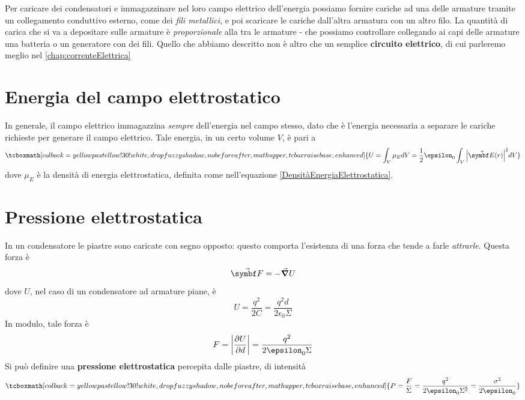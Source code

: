 \begin{observe}
	Per caricare dei condensatori e immagazzinare nel loro campo elettrico dell'energia possiamo fornire cariche ad una delle armature tramite un collegamento conduttivo esterno, come dei \textit{fili metallici}, e poi scaricare le cariche dall'altra armatura con un altro filo. La quantità di carica che si va a depositare sulle armature è \textit{proporzionale} alla \ddp tra le armature - che possiamo controllare collegando ai capi delle armature una batteria o un generatore con dei fili. Quello che abbiamo descritto non è altro che un semplice \textbf{circuito elettrico}, di cui parleremo meglio nel \autoref{chap:correnteElettrica}
\end{observe}
\section{Energia del campo elettrostatico}
In generale, il campo elettrico immagazzina \textit{sempre} dell'energia nel campo stesso, dato che è l'energia necessaria a separare le cariche richieste per generare il campo elettrico. Tale energia, in un certo volume $V$, è pari a
\begin{equation}
	\tcboxmath[colback=yellowpastellow!30!white,drop fuzzy shadow, nobeforeafter, math upper, tcbox raise base, enhanced]{U=\int_V\mu_EdV=\frac{1}{2}\epsilon_0\int_V\abs{\vba{E}(r)}^2dV}
\end{equation}
dove $\mu_E$ è la densità di energia elettrostatica, definita come nell'equazione \eqref{DensitàEnergiaElettrostatica}.
\section{Pressione elettrostatica}
In un condensatore le piastre sono caricate con segno opposto: questo comporta l'esistenza di una forza che tende a farle \textit{attrarle}. Questa forza è
\begin{equation}
	\vba{F}=-\grad{U}
\end{equation}
dove $U$, nel caso di un condensatore ad armature piane, è
\begin{equation*}
	U=\frac{q^2}{2C}=\frac{q^2d}{2\epsilon_0\Sigma}
\end{equation*}
In modulo, tale forza è
\begin{equation}
	F=\abs{\pdv{U}{d}}=\frac{q^2}{2\epsilon_0\Sigma}
\end{equation}
Si può definire una \textbf{pressione elettrostatica} percepita dalle piastre, di intensità
\begin{equation}
	\tcboxmath[colback=yellowpastellow!30!white,drop fuzzy shadow, nobeforeafter, math upper, tcbox raise base, enhanced]{P=\frac{F}{\Sigma}=\frac{q^2}{2\epsilon_0\Sigma^2}=\frac{\sigma^2}{2\epsilon_0}}
\end{equation}